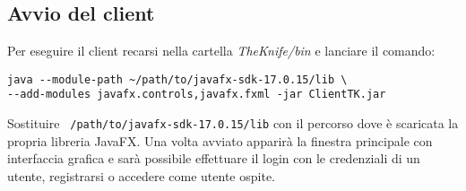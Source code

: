 \subsection{Avvio del client}
Per eseguire il client recarsi nella cartella \textit{TheKnife/bin} 
e lanciare il comando:
\begin{verbatim}
java --module-path ~/path/to/javafx-sdk-17.0.15/lib \
--add-modules javafx.controls,javafx.fxml -jar ClientTK.jar
\end{verbatim}
Sostituire \texttt{~/path/to/javafx-sdk-17.0.15/lib} con 
il percorso dove è scaricata la propria libreria JavaFX.
Una volta avviato apparirà la finestra principale con interfaccia grafica
e sarà possibile effettuare il login con le credenziali di un utente, 
registrarsi o accedere come utente ospite.
